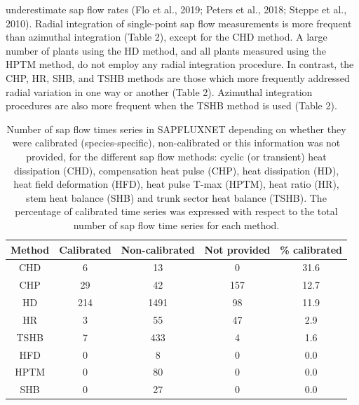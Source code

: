\documentclass[11pt,twoside]{reedthesis}
\begin{document}
underestimate sap flow rates (Flo et al., 2019; Peters et al., 2018;
Steppe et al., 2010). Radial integration of single-point sap flow
measurements is more frequent than azimuthal integration (Table 2),
except for the CHD method. A large number of plants using the HD method,
and all plants measured using the HPTM method, do not employ any radial
integration procedure. In contrast, the CHP, HR, SHB, and TSHB methods
are those which more frequently addressed radial variation in one way or
another (Table 2). Azimuthal integration procedures are also more
frequent when the TSHB method is used (Table 2).\par
\begin{table}[!h]

\caption[Number of sap flow times series in SAPFLUXNET depending on whether they were calibrated for the different sap flow methods.]{\label{tab:Ch3T1}Number of sap flow times series in SAPFLUXNET depending on whether they were calibrated (species-specific), non-calibrated or this information was not provided, for the different sap flow methods: cyclic (or transient) heat dissipation (CHD), compensation heat pulse (CHP), heat dissipation (HD), heat field deformation (HFD), heat pulse T-max (HPTM), heat ratio (HR), stem heat balance (SHB) and trunk sector heat balance (TSHB). The percentage of calibrated time series was expressed with respect to the total number of sap flow time series for each method.}
\centering
\fontsize{10}{12}\selectfont
\begin{tabular}[t]{ccccc}
\toprule
Method & Calibrated & Non-calibrated & Not provided & \% calibrated\\
\midrule
CHD & 6 & 13 & 0 & 31.6\\
CHP & 29 & 42 & 157 & 12.7\\
HD & 214 & 1491 & 98 & 11.9\\
HR & 3 & 55 & 47 & 2.9\\
TSHB & 7 & 433 & 4 & 1.6\\
HFD & 0 & 8 & 0 & 0.0\\
HPTM & 0 & 80 & 0 & 0.0\\
SHB & 0 & 27 & 0 & 0.0\\
\bottomrule
\end{tabular}
\end{table}
\end{document}
